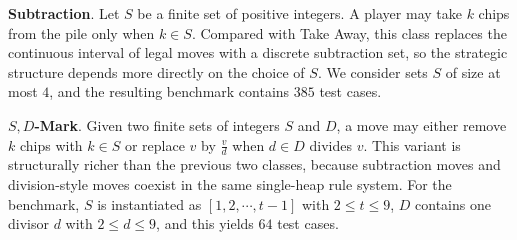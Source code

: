 \documentclass[review]{elsarticle}
\newcommand{\set}[1]{\{ #1 \}}
\newcommand{\tuple}[1]{\langle {#1} \rangle}
\newcommand{\true}{\top}
\newcommand{\statevar}{\mathcal{X}}
\newcommand{\act}{\mathcal{A}}
\newcommand{\constraint}{\mathcal{C}}
\newcommand{\estate}{\mathcal{E}}
\newcommand{\pre}{\mathtt{pre}}
\newcommand{\eff}{\mathtt{eff}}
\begin{document}
{\color{red}\textbf{Subtraction}. Let $S$ be a finite set of positive integers.}
{\color{red}A player may take $k$ chips from the pile only when $k \in S$.}
{\color{red}Compared with Take Away, this class replaces the continuous interval of legal moves with a discrete subtraction set, so the strategic structure depends more directly on the choice of $S$.}
{\color{red}We consider sets $S$ of size at most $4$, and the resulting benchmark contains $385$ test cases.}

{\color{red}\textbf{$S,D$-Mark}. Given two finite sets of integers $S$ and $D$, a move may either remove $k$ chips with $k \in S$ or replace $v$ by $\frac{v}{d}$ when $d \in D$ divides $v$.}
{\color{red}This variant is structurally richer than the previous two classes, because subtraction moves and division-style moves coexist in the same single-heap rule system.}
{\color{red}For the benchmark, $S$ is instantiated as $[1,2,\cdots,t-1]$ with $2 \le t \le 9$, $D$ contains one divisor $d$ with $2 \le d \le 9$, and this yields $64$ test cases.}
\end{document}

